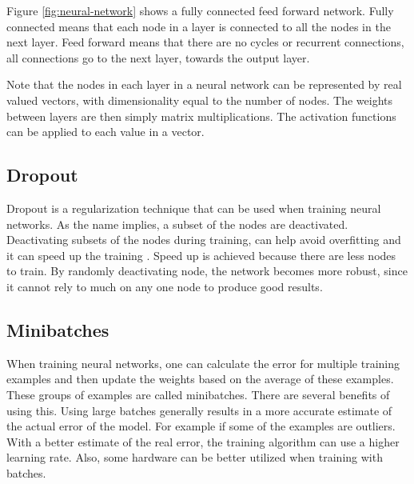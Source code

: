Figure \ref{fig:neural-network} shows a fully connected feed forward network. Fully connected means that each node in a layer is connected to all the nodes in the next layer. Feed forward means that there are no cycles or recurrent connections, all connections go to the next layer, towards the output layer.

Note that the nodes in each layer in a neural network can be represented by real valued vectors, with dimensionality equal to the number of nodes. The weights between layers are then simply matrix multiplications. The activation functions can be applied to each value in a vector.

\subsection{Dropout}
Dropout is a regularization technique that can be used when training neural networks. As the name implies, a subset of the nodes are deactivated. Deactivating subsets of the nodes during training, can help avoid overfitting and it can speed up the training \cite{Srivastava:2014:DSW:2627435.2670313}. Speed up is achieved because there are less nodes to train. By randomly deactivating node, the network becomes more robust, since it cannot rely to much on any one node to produce good results.

\subsection{Minibatches}
When training neural networks, one can calculate the error for multiple training examples and then update the weights based on the average of these examples. These groups of examples are called minibatches. There are several benefits of using this. Using large batches generally results in a more accurate estimate of the actual error of the model. For example if some of the examples are outliers. With a better estimate of the real error, the training algorithm can use a higher learning rate. Also, some hardware can be better utilized when training with batches. \cite{Goodfellow-et-al-2016-Book}

